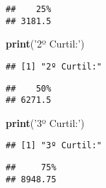 \documentclass[runningheads,a4paper]{llncs}
\newenvironment{Shaded}{\footnotesize}{}
\newcommand{\KeywordTok}[1]{\textcolor[rgb]{0.00,0.44,0.13}{\textbf{{#1}}}}
\newcommand{\DecValTok}[1]{\textcolor[rgb]{0.25,0.63,0.44}{{#1}}}
\newcommand{\StringTok}[1]{\textcolor[rgb]{0.25,0.44,0.63}{{#1}}}
\newcommand{\NormalTok}[1]{{#1}}
\newcommand{\OperatorTok}[1]{\textcolor[rgb]{0.40,0.40,0.40}{{#1}}}
\begin{document}
\begin{verbatim}
##    25% 
## 3181.5
\end{verbatim}

\begin{Shaded}
\begin{Highlighting}[]
\KeywordTok{print}\NormalTok{(}\StringTok{'2º Curtil:'}\NormalTok{)}
\end{Highlighting}
\end{Shaded}

\begin{verbatim}
## [1] "2º Curtil:"
\end{verbatim}

\begin{Shaded}
\end{Shaded}

\begin{verbatim}
##    50% 
## 6271.5
\end{verbatim}

\begin{Shaded}
\begin{Highlighting}[]
\KeywordTok{print}\NormalTok{(}\StringTok{'3º Curtil:'}\NormalTok{)}
\end{Highlighting}
\end{Shaded}

\begin{verbatim}
## [1] "3º Curtil:"
\end{verbatim}

\begin{Shaded}
\end{Shaded}

\begin{verbatim}
##     75% 
## 8948.75
\end{verbatim}
\end{document}
